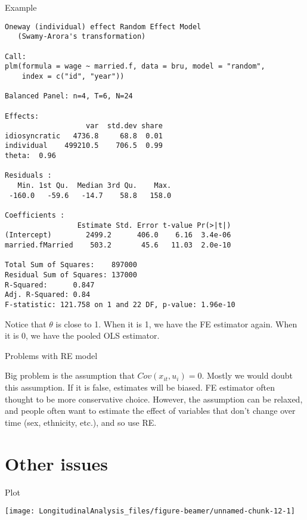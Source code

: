 \documentclass[10pt,ignorenonframetext,]{beamer}
\begin{document}
\begin{frame}[fragile]{Example}

\tiny

\begin{verbatim}
Oneway (individual) effect Random Effect Model 
   (Swamy-Arora's transformation)

Call:
plm(formula = wage ~ married.f, data = bru, model = "random", 
    index = c("id", "year"))

Balanced Panel: n=4, T=6, N=24

Effects:
                   var  std.dev share
idiosyncratic   4736.8     68.8  0.01
individual    499210.5    706.5  0.99
theta:  0.96  

Residuals :
   Min. 1st Qu.  Median 3rd Qu.    Max. 
 -160.0   -59.6   -14.7    58.8   158.0 

Coefficients :
                 Estimate Std. Error t-value Pr(>|t|)
(Intercept)        2499.2      406.0    6.16  3.4e-06
married.fMarried    503.2       45.6   11.03  2.0e-10

Total Sum of Squares:    897000
Residual Sum of Squares: 137000
R-Squared:      0.847
Adj. R-Squared: 0.84
F-statistic: 121.758 on 1 and 22 DF, p-value: 1.96e-10
\end{verbatim}

Notice that \(\theta\) is close to 1. When it is 1, we have the FE
estimator again. When it is 0, we have the pooled OLS estimator.

\end{frame}

\begin{frame}{Problems with RE model}

Big problem is the assumption that \(Cov(x_{it},u_i) = 0.\) Mostly we
would doubt this assumption. If it is false, estimates will be biased.
FE estimator often thought to be more conservative choice. However, the
assumption can be relaxed, and people often want to estimate the effect
of variables that don't change over time (sex, ethnicity, etc.), and so
use RE.

\end{frame}

\section{Other issues}\label{other-issues}

\begin{frame}{Plot}

\begin{center}\texttt{[image: LongitudinalAnalysis\_files/figure-beamer/unnamed-chunk-12-1]} \end{center}

\end{frame}
\end{document}
